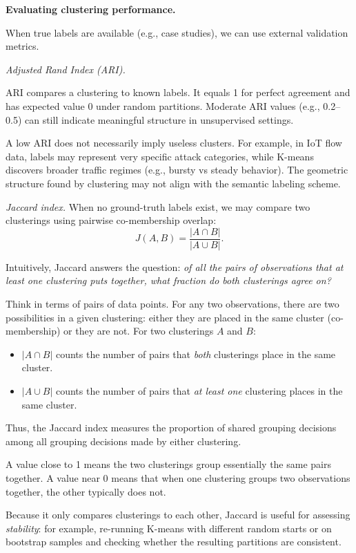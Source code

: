 \medskip

\textbf{Evaluating clustering performance.}

When true labels are available (e.g., case studies), we can use external validation metrics.

\emph{Adjusted Rand Index (ARI).}

ARI compares a clustering to known labels. It equals 1 for perfect agreement and has expected value 0 under random partitions. Moderate ARI values (e.g., 0.2–0.5) can still indicate meaningful structure in unsupervised settings.

A low ARI does not necessarily imply useless clusters. For example, in IoT flow data, labels may represent very specific attack categories, while K-means discovers broader traffic regimes (e.g., bursty vs steady behavior). The geometric structure found by clustering may not align with the semantic labeling scheme.

\emph{Jaccard index.}
When no ground-truth labels exist, we may compare two clusterings using pairwise co-membership overlap:
\[
J(A,B) = \frac{|A \cap B|}{|A \cup B|}.
\]

Intuitively, Jaccard answers the question: \emph{of all the pairs of observations that at least one clustering puts together, what fraction do both clusterings agree on?}

Think in terms of pairs of data points. For any two observations, there are two possibilities in a given clustering: either they are placed in the same cluster (co-membership) or they are not. For two clusterings $A$ and $B$:

\begin{itemize}[label=$\circ$, itemsep=0.3em]
    \item $|A \cap B|$ counts the number of pairs that \emph{both} clusterings place in the same cluster.
    \item $|A \cup B|$ counts the number of pairs that \emph{at least one} clustering places in the same cluster.
\end{itemize}

Thus, the Jaccard index measures the proportion of shared grouping decisions among all grouping decisions made by either clustering. 

A value close to 1 means the two clusterings group essentially the same pairs together. A value near 0 means that when one clustering groups two observations together, the other typically does not.

Because it only compares clusterings to each other, Jaccard is useful for assessing \emph{stability}: for example, re-running K-means with different random starts or on bootstrap samples and checking whether the resulting partitions are consistent.


